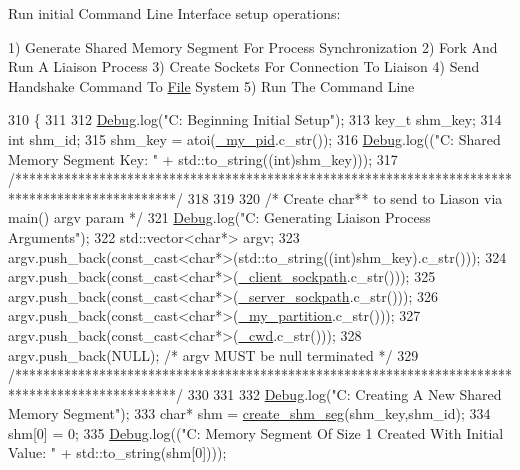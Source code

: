 Run initial Command Line Interface setup operations\+:

1) Generate Shared Memory Segment For Process Synchronization 2) Fork And Run A Liaison Process 3) Create Sockets For Connection To Liaison 4) Send Handshake Command To \mbox{\hyperlink{class_file}{File}} System 5) Run The Command Line 
\begin{DoxyCode}
310 \{
311 
312   \mbox{\hyperlink{_cli_8h_ab6d95a4e6a59b4ad033ed3af31d878e0}{Debug}}.log(\textcolor{stringliteral}{"C: Beginning Initial Setup"});
313   key\_t shm\_key;
314   \textcolor{keywordtype}{int} shm\_id;
315   shm\_key = atoi(\mbox{\hyperlink{class_c_l_i_a589aa7edb9b2454720d5b54af3ddea00}{\_my\_pid}}.c\_str());
316   \mbox{\hyperlink{_cli_8h_ab6d95a4e6a59b4ad033ed3af31d878e0}{Debug}}.log((\textcolor{stringliteral}{"C: Shared Memory Segment Key: "} + std::to\_string((\textcolor{keywordtype}{int})shm\_key)));
317   \textcolor{comment}{/***********************************************************************************************/}
318 
319 
320   \textcolor{comment}{/* Create char** to send to Liason via main() argv param */}
321   \mbox{\hyperlink{_cli_8h_ab6d95a4e6a59b4ad033ed3af31d878e0}{Debug}}.log(\textcolor{stringliteral}{"C: Generating Liaison Process Arguments"});
322   std::vector<char*> argv;
323   argv.push\_back(const\_cast<char*>(std::to\_string((\textcolor{keywordtype}{int})shm\_key).c\_str()));
324   argv.push\_back(const\_cast<char*>(\mbox{\hyperlink{class_c_l_i_ad3b7579608f8c2e1d4c01a8668f701d9}{\_client\_sockpath}}.c\_str()));
325   argv.push\_back(const\_cast<char*>(\mbox{\hyperlink{class_c_l_i_a582f907a9e5dc5c0dcd264e2f1b14f76}{\_server\_sockpath}}.c\_str()));
326   argv.push\_back(const\_cast<char*>(\mbox{\hyperlink{class_c_l_i_aa58101a66621f7b2b64d4e566ad7bd89}{\_my\_partition}}.c\_str()));
327   argv.push\_back(const\_cast<char*>(\mbox{\hyperlink{class_c_l_i_a664097f330fa6beaad30f35eb9577ce1}{\_cwd}}.c\_str()));
328   argv.push\_back(NULL); \textcolor{comment}{/* argv MUST be null terminated */}
329   \textcolor{comment}{/***********************************************************************************************/}
330 
331 
332   \mbox{\hyperlink{_cli_8h_ab6d95a4e6a59b4ad033ed3af31d878e0}{Debug}}.log(\textcolor{stringliteral}{"C: Creating A New Shared Memory Segment"});
333   \textcolor{keywordtype}{char}* shm = \mbox{\hyperlink{cli__helper_8hpp_a14dda64a66946535eb19bb8af973fc73}{create\_shm\_seg}}(shm\_key,shm\_id);
334   shm[0] = 0;
335   \mbox{\hyperlink{_cli_8h_ab6d95a4e6a59b4ad033ed3af31d878e0}{Debug}}.log((\textcolor{stringliteral}{"C: Memory Segment Of Size 1 Created With Initial Value: "} + std::to\_string(shm[0])));

\end{DoxyCode}
